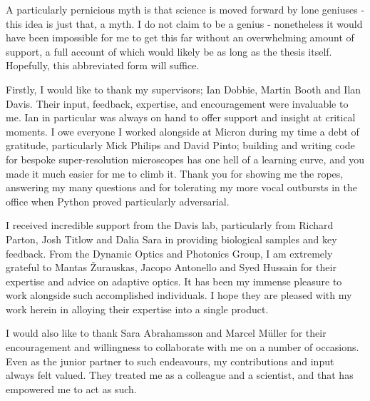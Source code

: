 \begin{acknowledgements}

\vspace{-1.1cm}

{\small %
	
A particularly pernicious myth is that science is moved forward by lone geniuses - 
this idea is just that, a myth. I do not claim to be a genius - nonetheless it would 
have been impossible for me to get this far without an overwhelming amount of 
support, a full account of which would likely be as long as the thesis itself. 
Hopefully, this abbreviated form  will suffice.

Firstly, I would like to thank my supervisors; Ian Dobbie, Martin Booth and Ilan
Davis. Their input, feedback, expertise, and encouragement were invaluable to me. 
Ian in particular was always on hand to offer support and insight at critical 
moments. I owe everyone I worked alongside at Micron during my time a debt 
of gratitude, particularly Mick Philips and David Pinto; building and writing code 
for bespoke super-resolution microscopes has one hell of a learning curve, and 
you made it much easier for me to climb it. Thank you for showing me the ropes,
answering my many questions and for tolerating my more vocal outbursts in the 
office when Python proved particularly adversarial. 

I received incredible support from the Davis lab, particularly from Richard Parton, 
Josh Titlow and Dalia Sara in providing biological samples and key feedback. From 
the Dynamic Optics and Photonics Group, I am extremely grateful to Mantas 
\v{Z}urauskas, Jacopo Antonello and Syed Hussain for their expertise and advice 
on adaptive optics. It has been my immense pleasure to work alongside such 
accomplished individuals. I hope they are pleased with my work herein in alloying
their expertise into a single product.

I would also like to thank Sara Abrahamsson and Marcel M\"{u}ller for their 
encouragement and willingness to collaborate with me on a number of occasions. 
Even as the junior partner to such endeavours, my contributions and input always
felt valued. They treated me as a colleague and a scientist, and that has empowered
me to act as such.

}
\end{acknowledgements}

